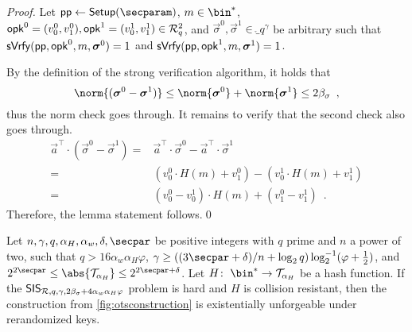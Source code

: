 \begin{proof}
  Let $\params\gets\setup(\secparam)$, $m\in\bin^*$, $\mathsf{opk}^0=(v^0_0,v^0_1),\mathsf{opk}^1=(v^1_0,v^1_1)\in \mathcal{R}^2_q$, and $\vec{\sigma}^0,\vec{\sigma}^1 \in \ring_q^\gamma$ be arbitrary such that $\mathsf{sVrfy}(\mathsf{pp},\mathsf{opk}^0,m,\boldsymbol{\sigma}^0)=1$ and $\mathsf{sVrfy}(\mathsf{pp},\mathsf{opk}^1,m,\boldsymbol{\sigma}^1)=1$.
  
  By the definition of the strong verification algorithm, it holds that
  \begin{equation*}
     \norm{(\vec{\sigma}^0-\vec{\sigma}^1)}
    \leq \norm{\vec{\sigma}^0}+\norm{\vec{\sigma}^1}
    \leq 2\beta_\sigma\enspace,
  \end{equation*}
  thus the norm check goes through.
  It remains to verify that the second check also goes through.
  \begin{align*}
     \vec{a}^\intercal\cdot (\vec{\sigma}^0-\vec{\sigma}^1)
    ={}& \vec{a}^\intercal\cdot \vec{\sigma}^0- \vec{a}^\intercal\cdot\vec{\sigma}^1\\
    ={}& (v^0_0\cdot H(m) + v^0_1) - (v^1_0\cdot H(m) + v^1_1)\tag{Def of $\sverify$}\\
    ={}& (v^0_0-v^1_0)\cdot H(m) + (v^0_1-v^1_1)\enspace.
  \end{align*}
  Therefore, the lemma statement follows.\qed
\end{proof}


\begin{lemma}\label{lem:kots_sis}
  Let $n,\gamma,q,\alpha_H,\alpha_w,\delta,\secpar$ be positive integers with $q$ prime and $n$ a power of two, such that $q > 16 \alpha_w \alpha_H\varphi$, $\gamma\geq((3\secpar+\delta)/n+\log_2q)\log^{-1}_2(\varphi+\tfrac{1}{2})$, and $2^{2\secpar} \leq \abs{\tern_{\alpha_H}} \leq 2^{2\secpar + \delta}$.
  Let $H\colon\; \bin^* \to \tern_{\alpha_H}$ be a hash function.
  If the $\mathsf{SIS}_{\mathcal{R},q,\gamma,2\beta_\sigma + 4\alpha_w\alpha_H\varphi}$ problem is hard and $H$ is collision resistant, then the construction from \autoref{fig:otsconstruction} is existentially unforgeable under rerandomized keys.
\end{lemma}

